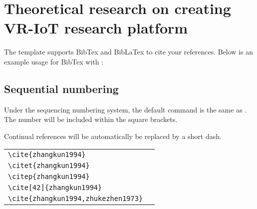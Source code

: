 
\chapter{Theoretical research on creating VR-IoT research platform}

The template supports BibTex and BibLaTex to cite your references. Below is an example usage for BibTex with :


\section{Sequential numbering}

Under the sequencing numbering system, the default  command is the same as . The number will be included within the square brackets.

Continual references will be automatically be replaced by a short dash.

\begin{tabular}{l@{\quad$\Rightarrow$\quad}l}
  \verb|\cite{zhangkun1994}|               & \cite{zhangkun1994}               \\
  \verb|\citet{zhangkun1994}|              & \citet{zhangkun1994}              \\
  \verb|\citep{zhangkun1994}|              & \citep{zhangkun1994}              \\
  \verb|\cite[42]{zhangkun1994}|           & \cite[42]{zhangkun1994}           \\
  \verb|\cite{zhangkun1994,zhukezhen1973}| & \cite{zhangkun1994,zhukezhen1973} \\
\end{tabular}





